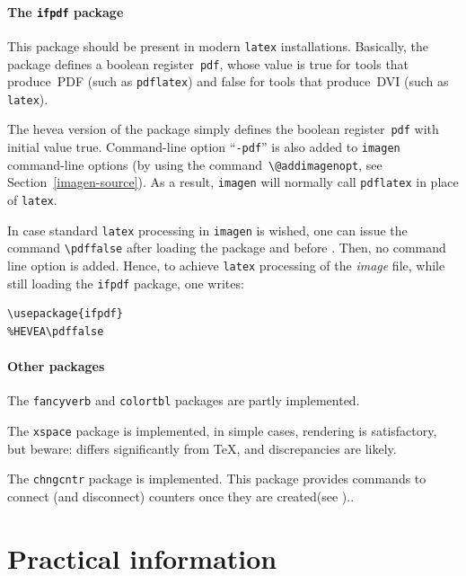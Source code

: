 \subsection{The \texttt{ifpdf} package}
This package should be present in modern \texttt{latex} installations.
Basically, the package defines a boolean register~\texttt{pdf}, whose
value is true for tools that produce~\textsc{PDF} (such as
\texttt{pdflatex}) and false for tools that produce~\textsc{DVI}
(such as \texttt{latex}).

The hevea version of the package simply defines the boolean
register~\texttt{pdf} with initial value true.  Command-line option
``\texttt{-pdf}'' is also added to \texttt{imagen} command-line
options (by using the command~\verb+\@addimagenopt+, see
Section~\ref{imagen-source}).  As a result, \texttt{imagen} will
normally call \texttt{pdflatex} in place of \texttt{latex}.

In case standard \texttt{latex} processing in \texttt{imagen} is
wished, one can issue the command \verb+\pdffalse+ after loading the
 package and before \verb++. Then, no
command line option is added.
Hence, to achieve \texttt{latex} processing of the \textit{image}
file, while still loading the \texttt{ifpdf} package, one writes:
\begin{verbatim}
\usepackage{ifpdf}
%HEVEA\pdffalse
\end{verbatim}

\subsection{Other packages}
The \texttt{fancyverb} and \texttt{colortbl}
packages are partly implemented.

The \texttt{xspace} package is implemented,
in simple cases, rendering is satisfactory, but beware: \hevea{}
differs significantly from \TeX{}, and discrepancies are likely.

The \texttt{chngcntr} package is implemented.
This package provides commands to connect (and disconnect) counters
once they are created\ifhevea(see
).\else.\fi

\cutend
\setcounter{section}{0}

\part{Practical \label{practical}information}

